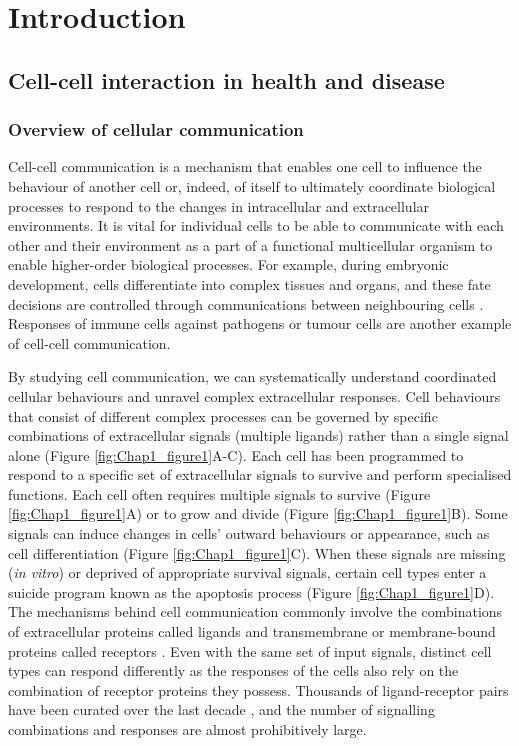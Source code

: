 \chapter[Introduction]{Introduction}
\label{Chap:Intro}


\section{Cell-cell interaction in health and disease}

\subsection{Overview of cellular communication}
Cell-cell communication is a mechanism that enables one cell to influence the behaviour of another cell or, indeed, of itself to ultimately coordinate biological processes to respond to the changes in intracellular and extracellular environments. It is vital for individual cells to be able to communicate with each other and their environment as a part of a functional multicellular organism to enable higher-order biological processes. For example, during embryonic development, cells differentiate into complex tissues and organs, and these fate decisions are controlled through communications between neighbouring cells \cite{gale1996eph, eichmann1997ligand}. Responses of immune cells against pathogens or tumour cells are another example of cell-cell communication. 

By studying cell communication, we can systematically understand coordinated cellular behaviours and unravel complex extracellular responses. Cell behaviours that consist of different complex processes can be governed by specific combinations of extracellular signals (multiple ligands) rather than a single signal alone (Figure \ref{fig:Chap1_figure1}A-C). Each cell has been programmed to respond to a specific set of extracellular signals to survive and perform specialised functions. Each cell often requires multiple signals to survive (Figure \ref{fig:Chap1_figure1}A) or to grow and divide (Figure \ref{fig:Chap1_figure1}B). Some signals can induce changes in cells' outward behaviours or appearance, such as cell differentiation (Figure \ref{fig:Chap1_figure1}C). When these signals are missing (\ie \textit{in vitro}) or deprived of appropriate survival signals, certain cell types enter a suicide program known as the apoptosis process (Figure \ref{fig:Chap1_figure1}D). The mechanisms behind cell communication commonly involve the combinations of extracellular proteins called ligands and transmembrane or membrane-bound proteins called receptors \cite{alberts2018molecular}. Even with the same set of input signals, distinct cell types can respond differently as the responses of the cells also rely on the combination of receptor proteins they possess. Thousands of ligand-receptor pairs have been curated over the last decade \cite{salwinski2004database, orchard2012protein}, and the number of signalling combinations and responses are almost prohibitively large.

